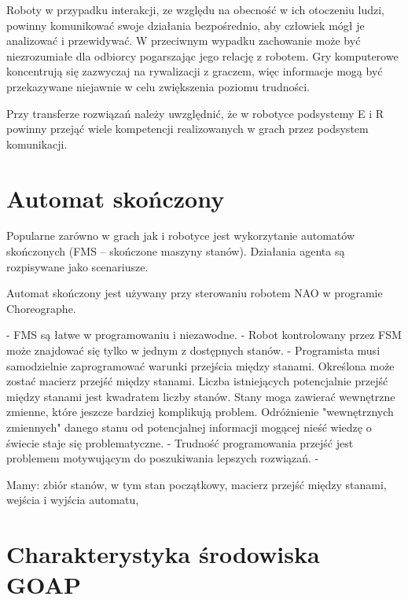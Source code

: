 Roboty w przypadku interakcji, ze względu na obecność w ich otoczeniu ludzi, powinny komunikować swoje działania bezpośrednio, aby człowiek mógł je analizować i przewidywać. W przeciwnym wypadku zachowanie może być niezrozumiałe dla odbiorcy pogarszając jego relację z robotem. Gry komputerowe koncentrują się zazwyczaj na rywalizacji z graczem, więc informacje mogą być przekazywane niejawnie w celu zwiększenia poziomu trudności.

Przy transferze rozwiązań należy uwzględnić, że w robotyce podsystemy E i R powinny przejąć wiele kompetencji realizowanych w grach przez podsystem komunikacji.



\section{Automat skończony}

Popularne zarówno w grach jak i robotyce jest wykorzytanie automatów skończonych (FMS – skończone maszyny stanów). Działania agenta są rozpisywane jako scenariusze. 

Automat skończony jest używany przy sterowaniu robotem NAO w programie Choreographe.



- FMS są łatwe w programowaniu i niezawodne.
- Robot kontrolowany przez FSM może znajdować się tylko w jednym z dostępnych stanów.
- Programista musi samodzielnie zaprogramować warunki przejścia między stanami. Określona może zostać macierz przejść między stanami. Liczba istniejących potencjalnie przejść między stanami jest kwadratem liczby stanów. Stany moga zawierać wewnętrzne zmienne, które jeszcze bardziej komplikują problem. Odróżnienie "wewnętrznych zmiennych" danego stanu od potencjalnej informacji mogącej nieść wiedzę o świecie staje się problematyczne.
- Trudność programowania przejść jest problemem motywującym do poszukiwania lepszych rozwiązań.
- 

Mamy: zbiór stanów, w tym stan początkowy, macierz przejść między stanami, wejścia i wyjścia automatu,

\section{Charakterystyka środowiska GOAP}

